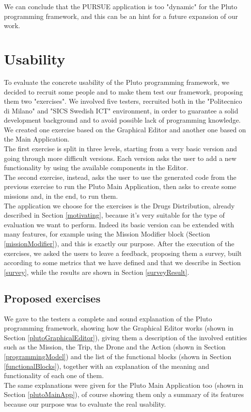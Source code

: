 We can conclude that the PURSUE application is too "dynamic" for the Pluto programming framework, and this can be an hint for a future expansion of our work.


\newpage

\section{Usability}
\label{usability}

To evaluate the concrete usability of the Pluto programming framework, we decided to recruit some people and to make them test our framework, proposing them two "exercises".
We involved five testers, recruited both in the "Politecnico di Milano" and "SICS Swedish ICT" environment, in order to guarantee a solid development background and to avoid possible lack of programming knowledge.
We created one exercise based on the Graphical Editor and another one based on the Main Application.
\\

The first exercise is split in three levels, starting from a very basic version and going through more difficult versions. Each version asks the user to add a new functionality by using the available components in the Editor.
\\
The second exercise, instead, asks the user to use the generated code from the previous exercise to run the Pluto Main Application, then asks to create some missions and, in the end, to run them.
\\

The application we choose for the exercises is the Drugs Distribution, already described in Section \ref{motivating}, because it's very suitable for the type of evaluation we want to perform.
Indeed its basic version can be extended with many features, for example using the Mission Modifier block (Section \ref{missionModifier}), and this is exactly our purpose.
After the execution of the exercises, we asked the users to leave a feedback, proposing them a survey, built according to some metrics that we have defined and that we describe in Section \ref{survey}, while the results are shown in Section \ref{surveyResult}.

\subsection{Proposed exercises}
\label{exercise}

We gave to the testers a complete and sound explanation of the Pluto programming framework, showing how the Graphical Editor works (shown in Section \ref{plutoGraphicalEditor}), giving them a description of the involved entities such as the Mission, the Trip, the Drone and the Action (shown in Section \ref{programmingModel}) and the list of the functional blocks (shown in Section \ref{functionalBlocks}), together with an explanation of the meaning and functionality of each one of them.
\\
The same explanations were given for the Pluto Main Application too (shown in Section \ref{plutoMainApp}), of course showing them only a summary of its features because our purpose was to evaluate the real usability.

